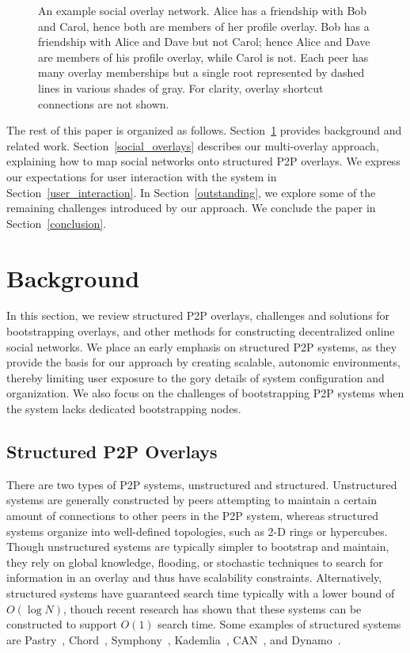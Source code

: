 \documentclass[conference]{IEEEtran}
\begin{document}
\begin{figure}[h]
\centering
{}
\caption{An example social overlay network.  Alice has a friendship with Bob
and Carol, hence both are members of her profile overlay. Bob has a friendship
with Alice and Dave but not Carol; hence Alice and Dave are members of his
profile overlay, while Carol is not.  Each peer has many overlay memberships
but a single root represented by dashed lines in various shades of gray.  For
clarity, overlay shortcut connections are not shown.} \label{fig:system}
\end{figure}

The rest of this paper is organized as follows.  Section~\ref{background}
provides background and related work.  Section~\ref{social_overlays} describes
our multi-overlay approach, explaining how to map social networks onto
structured P2P overlays.  We express our expectations for user interaction with
the system in Section~\ref{user_interaction}.  In Section~\ref{outstanding}, we
explore some of the remaining challenges introduced by our approach.  We
conclude the paper in Section~\ref{conclusion}.

\section{Background}
\label{background}

In this section, we review structured P2P overlays, challenges and solutions
for bootstrapping overlays, and other methods for constructing decentralized
online social networks.  We place an early emphasis on structured P2P systems,
as they  provide the basis for our approach by  creating scalable, autonomic
environments, thereby limiting user exposure to the gory details of system
configuration and organization.  We also focus on the challenges of
bootstrapping P2P systems when the system lacks dedicated bootstrapping nodes.

\subsection{Structured P2P Overlays}

There are two types of P2P systems, unstructured and structured.  Unstructured
systems are generally constructed by peers attempting to maintain a certain
amount of connections to other peers in the P2P system, whereas structured
systems organize into well-defined topologies, such as 2-D rings or hypercubes.
Though unstructured systems are typically simpler to bootstrap and maintain,
they rely on global knowledge, flooding, or stochastic techniques to search for
information in an overlay and thus have scalability constraints.
Alternatively, structured systems have guaranteed search time typically with a
lower bound of $O(\log N)$, thouch recent research has shown that these systems
can be constructed to support $O(1)$ search time.  Some examples of structured
systems are Pastry~\cite{pastry}, Chord~\cite{chord}, Symphony~\cite{symphony},
Kademlia~\cite{kademlia}, CAN~\cite{can}, and Dynamo~\cite{dynamo}.
\end{document}
